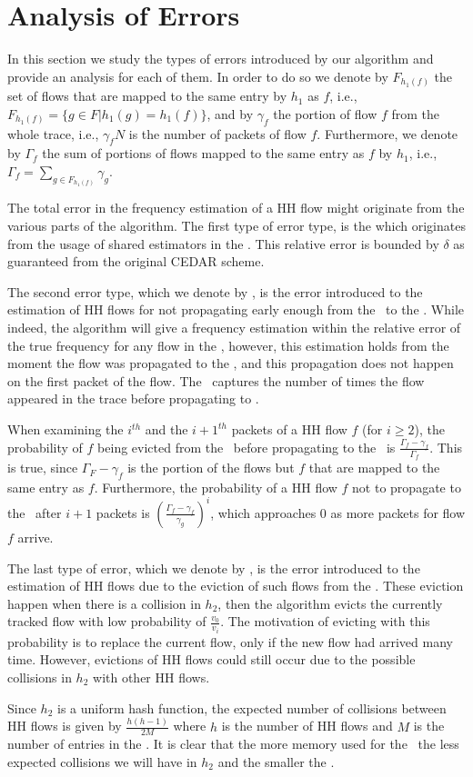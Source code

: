\section{Analysis of Errors}
\label{sec:theory}
In this section we study the types of errors introduced by our algorithm and provide an analysis for each of them. In order to do so we denote by $F_{h_1(f)}$ the set of flows that are mapped to the same entry by $h_1$ as $f$, i.e., $F_{h_1(f)} = \{g\in F | h_1(g)=h_1(f)\}$, and by $\gamma_f$ the portion of flow $f$ from the whole trace, i.e., $\gamma_f N$ is the number of packets of flow $f$. Furthermore, we denote by $\Gamma_f$ the sum of portions of flows mapped to the same entry as $f$ by $h_1$, i.e., $\Gamma_f=\sum_{g\in F_{h_1(f)}} \gamma_g$.

The total error in the frequency estimation of a HH flow might originate from the various parts of the algorithm. The first type of error type, is the \textit{\ee} which originates from the usage of shared estimators in the \sea. This relative error is bounded by $\delta$ as guaranteed from the original CEDAR scheme.

The second error type, which we denote by \textit{\pe}, is the error introduced to the estimation of HH flows for not propagating early enough from the \sfa\ to the \cs. While indeed, the algorithm will give a frequency estimation within the relative error of the true frequency for any flow in the \cs, however, this estimation holds from the moment the flow was propagated to the \cs, and this propagation does not happen on the first packet of the flow. The \pe\ captures the number of times the flow appeared in the trace before propagating to \cs.

When examining the $i^{th}$ and the ${i+1}^{th}$ packets of a HH flow $f$ (for $i\geq 2$), the probability of $f$ being evicted from the \sfa\ before propagating to the \cs\ is $\frac{\Gamma_f-\gamma_f}{\Gamma_f}$. This is true, since $\Gamma_F-\gamma_f$ is the portion of the flows but $f$ that are mapped to the same entry as $f$. Furthermore, the probability of a HH flow $f$ not to propagate to the \cs\ after $i+1$ packets is $\left(\frac{\Gamma_f-\gamma_f}{\gamma_g}\right)^{i}$, which approaches $0$ as more packets for flow $f$ arrive.

The last type of error, which we denote by \textit{\eve}, is the error introduced to the estimation of HH flows due to the eviction of such flows from the \cs. These eviction happen when there is a collision in $h_2$, then the algorithm evicts the currently tracked flow with low probability of $\frac{v_0}{v_i}$. The motivation of evicting with this probability is to replace the current flow, only if the new flow had arrived many time. However, evictions of HH flows could still occur due to the possible collisions in $h_2$ with other HH flows.

Since $h_2$ is a uniform hash function, the expected number of collisions between HH flows is given by $\frac{h(h-1)}{2M}$ where $h$ is the number of HH flows and $M$ is the number of entries in the \cs. It is clear that the more memory used for the \cs\ the less expected collisions we will have in $h_2$ and the smaller the \eve.
